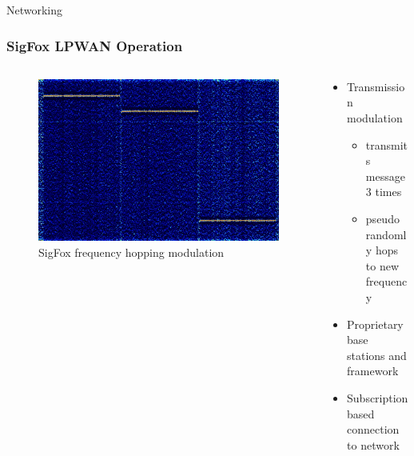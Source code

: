 \documentclass{beamer}
\begin{document}
  \begin{frame}{Networking}
    \frametitle{SigFox LPWAN Operation}
    \begin{columns}
      \begin{column}{0.5\textwidth}
        \begin{figure}[htbp]
          \centering
          \includegraphics[width=\textwidth]{Sigfox_Spectrum_Analysis.jpg}
          \caption{SigFox frequency hopping modulation \cite{SIGFOXsignalwiki}}
          \label{fig:SigFox_Spectrum}
        \end{figure}
      \end{column}
      \begin{column}{0.5\textwidth}
        \begin{itemize}
          \item Transmission modulation
          \begin{itemize}
            \item transmits message 3 times
            \item pseudo randomly hops to new frequency
          \end{itemize}
          \item Proprietary base stations and framework
          \item Subscription based connection to network
        \end{itemize}
      \end{column}
    \end{columns}
  \end{frame}
\end{document}
